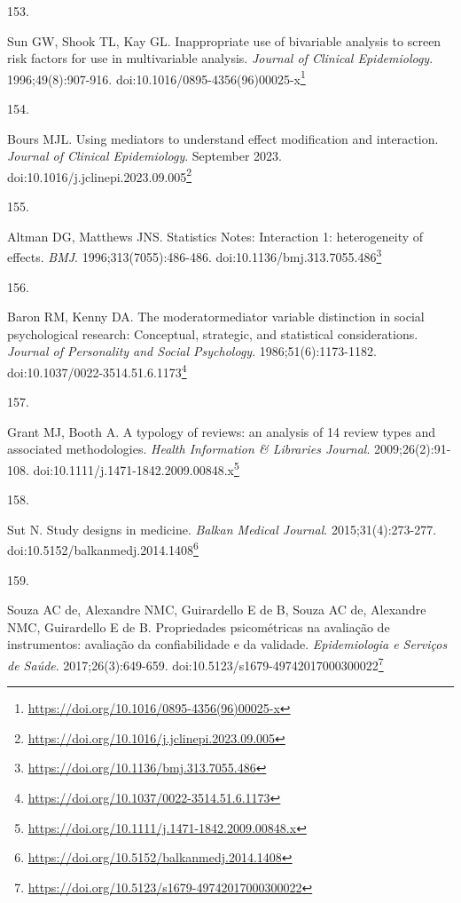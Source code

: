 \documentclass[
  a4paper,
]{book}
\newlength{\cslhangindent}
\newlength{\csllabelwidth}
\newlength{\cslentryspacingunit} %
\newenvironment{CSLReferences}[2] %
 {%
  \setlength{\parindent}{0pt}
  \ifodd #1
  \let\oldpar\par
  \def\par{\hangindent=\cslhangindent\oldpar}
  \fi
  \setlength{\parskip}{#2\cslentryspacingunit}
 }%
 {}
\newcommand{\CSLLeftMargin}[1]{\parbox[t]{\csllabelwidth}{#1}}
\newcommand{\CSLRightInline}[1]{\parbox[t]{\linewidth - \csllabelwidth}{#1}\break}
\renewcommand{\href}[2]{#2\footnote{\url{#1}}}
\begin{document}
\begin{CSLReferences}{0}{0}
\leavevmode{}%
\CSLLeftMargin{153. }%
\CSLRightInline{Sun GW, Shook TL, Kay GL. Inappropriate use of bivariable analysis to screen risk factors for use in multivariable analysis. \emph{Journal of Clinical Epidemiology}. 1996;49(8):907-916. doi:\href{https://doi.org/10.1016/0895-4356(96)00025-x}{10.1016/0895-4356(96)00025-x}}

\leavevmode{}%
\CSLLeftMargin{154. }%
\CSLRightInline{Bours MJL. Using mediators to understand effect modification and interaction. \emph{Journal of Clinical Epidemiology}. September 2023. doi:\href{https://doi.org/10.1016/j.jclinepi.2023.09.005}{10.1016/j.jclinepi.2023.09.005}}

\leavevmode{}%
\CSLLeftMargin{155. }%
\CSLRightInline{Altman DG, Matthews JNS. Statistics Notes: Interaction 1: heterogeneity of effects. \emph{BMJ}. 1996;313(7055):486-486. doi:\href{https://doi.org/10.1136/bmj.313.7055.486}{10.1136/bmj.313.7055.486}}

\leavevmode{}%
\CSLLeftMargin{156. }%
\CSLRightInline{Baron RM, Kenny DA. The moderator{\textendash}mediator variable distinction in social psychological research: Conceptual, strategic, and statistical considerations. \emph{Journal of Personality and Social Psychology}. 1986;51(6):1173-1182. doi:\href{https://doi.org/10.1037/0022-3514.51.6.1173}{10.1037/0022-3514.51.6.1173}}

\leavevmode{}%
\CSLLeftMargin{157. }%
\CSLRightInline{Grant MJ, Booth A. A typology of reviews: an analysis of 14 review types and associated methodologies. \emph{Health Information \& Libraries Journal}. 2009;26(2):91-108. doi:\href{https://doi.org/10.1111/j.1471-1842.2009.00848.x}{10.1111/j.1471-1842.2009.00848.x}}

\leavevmode{}%
\CSLLeftMargin{158. }%
\CSLRightInline{Sut N. Study designs in medicine. \emph{Balkan Medical Journal}. 2015;31(4):273-277. doi:\href{https://doi.org/10.5152/balkanmedj.2014.1408}{10.5152/balkanmedj.2014.1408}}

\leavevmode{}%
\CSLLeftMargin{159. }%
\CSLRightInline{Souza AC de, Alexandre NMC, Guirardello E de B, Souza AC de, Alexandre NMC, Guirardello E de B. Propriedades psicométricas na avaliação de instrumentos: avaliação da confiabilidade e da validade. \emph{Epidemiologia e Serviços de Saúde}. 2017;26(3):649-659. doi:\href{https://doi.org/10.5123/s1679-49742017000300022}{10.5123/s1679-49742017000300022}}


\end{CSLReferences}
\end{document}
